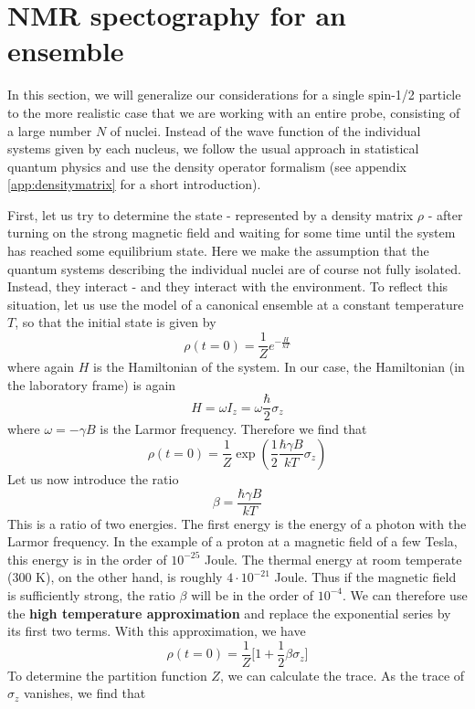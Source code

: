 \documentclass[a4paper, draft]{article}
\theoremstyle{own}
\theoremstyle{remark}
\begin{document}
\section{NMR spectography for an ensemble}

In this section, we will generalize our considerations for a single spin-1/2 particle to the more realistic case that we are working with an entire probe, consisting of a large number $N$ of nuclei. Instead of the wave function of the individual systems given by each nucleus, we follow the usual approach in statistical quantum physics and use the density operator formalism (see appendix \ref{app:densitymatrix} for a short introduction). 

First, let us try to determine the state - represented by a density matrix $\rho$ - after turning on the strong magnetic field and waiting for some time until the system has reached some equilibrium state. Here we make the assumption that the quantum systems describing the individual nuclei are of course not fully isolated. Instead, they interact - and they interact with the environment. To reflect this situation, let us use the model of a canonical ensemble at a constant temperature $T$, so that the initial state is given by
$$
\rho(t=0) = \frac{1}{Z} e^{-\frac{H}{kT}}
$$
where again $H$ is the Hamiltonian of the system. In our case, the Hamiltonian (in the laboratory frame) is again 
$$
H =  \omega I_z = \omega \frac{\hbar}{2} \sigma_z
$$
where $\omega = -\gamma B$ is the Larmor frequency. Therefore we find that
$$
\rho(t=0) = \frac{1}{Z} \exp \left( \frac{1}{2} \frac{\hbar \gamma B}{kT} \sigma_z \right)
$$
Let us now introduce the ratio
$$
\beta = \frac{\hbar \gamma B}{kT}
$$
This is a ratio of two energies. The first energy is the energy of a photon with the Larmor frequency. In the example of a proton at a magnetic field of a few Tesla, this energy is in the order of $10^{-25}$ Joule. The thermal energy at room temperate (300 K), on the other hand, is roughly $4 \cdot 10^{-21}$ Joule. Thus if the magnetic field is sufficiently strong, the ratio $\beta$ will be in the order of $10^{-4}$. We can therefore use the {\bf high temperature approximation} and replace the exponential series by its first two terms. With this approximation, we have
$$
\rho(t=0) = \frac{1}{Z} \big[ 1 + \frac{1}{2} \beta \sigma_z \big] 
$$ 
To determine the partition function $Z$, we can calculate the trace. As the trace of $\sigma_z$ vanishes, we find that 
\end{document}
